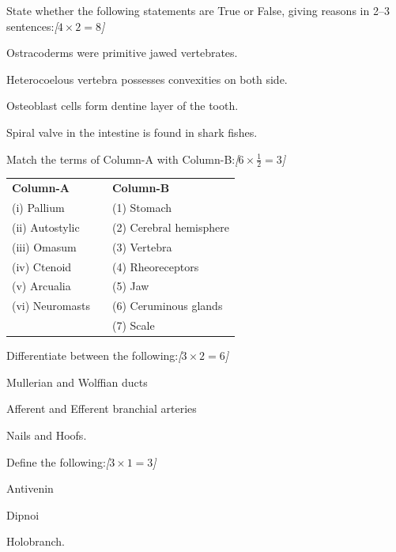 \documentclass[11pt,a4paper]{article}
\newcommand{\pts}[1]{\hfill   \textit{[#1]}}
\begin{document}
\begin{parts}
  \item State whether the following statements are True or False, giving reasons in 2--3 sentences:\pts{$4  \times 2 = 8$}
  
\begin{parts}
    \item Ostracoderms were primitive jawed vertebrates.
    \item Heterocoelous vertebra possesses convexities on both side.
    \item Osteoblast cells form dentine layer of the tooth.
    \item Spiral valve in the intestine is found in shark fishes.
  \end{parts}
  
  \item Match the terms of Column-A with Column-B:\pts{$6  \times \frac{1}{2} = 3$}
  
\begin{center}
    
\begin{tabular}{lp{1cm}l}
   \textbf{Column-A} & &   \textbf{Column-B} \\
      (i) Pallium & & (1) Stomach \\
      (ii) Autostylic & & (2) Cerebral hemisphere \\
      (iii) Omasum & & (3) Vertebra \\
      (iv) Ctenoid & & (4) Rheoreceptors \\
      (v) Arcualia & & (5) Jaw \\
      (vi) Neuromasts & & (6) Ceruminous glands \\
       & & (7) Scale \\
    \end{tabular}
  \end{center}

  \item Differentiate between the following:\pts{$3  \times 2 = 6$}
  
\begin{parts}
    \item Mullerian and Wolffian ducts
    \item Afferent and Efferent branchial arteries
    \item Nails and Hoofs.
  \end{parts}

  \item Define the following:\pts{$3  \times 1 = 3$}
  
\begin{parts}
    \item Antivenin
    \item Dipnoi
    \item Holobranch.
  \end{parts}
\end{parts}
\end{document}
